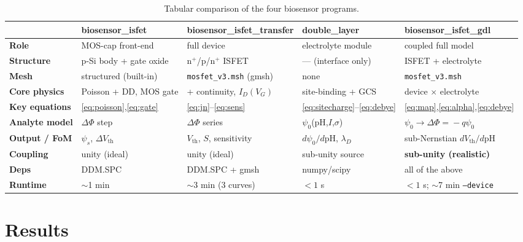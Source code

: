 \documentclass[11pt,a4paper]{article}
\newcommand{\code}[1]{\texttt{#1}}
\begin{document}
\begin{table}[htbp]
\centering
\captionsetup{width=\textwidth}
\caption{Tabular comparison of the four biosensor programs.}
\label{tab:compare}
\footnotesize
\renewcommand{\arraystretch}{1.35}
\begin{tabular}{@{}p{2.6cm}p{2.9cm}p{2.9cm}p{2.9cm}p{2.6cm}@{}}
\toprule
 & \textbf{biosensor\_isfet} & \textbf{biosensor\_isfet\_transfer} & \textbf{double\_layer} & \textbf{biosensor\_isfet\_gdl} \\
\midrule
\textbf{Role} & MOS-cap front-end & full device & electrolyte module & coupled full model \\
\textbf{Structure} & p-Si body + gate oxide & n$^+$/p/n$^+$ ISFET & --- (interface only) & ISFET + electrolyte \\
\textbf{Mesh} & structured (built-in) & \code{mosfet\_v3.msh} (gmsh) & none & \code{mosfet\_v3.msh} \\
\textbf{Core physics} & Poisson + DD, MOS gate & + continuity, $I_D(V_G)$ & site-binding + GCS & device $\times$ electrolyte \\
\textbf{Key equations} & \eqref{eq:poisson},\eqref{eq:gate} & \eqref{eq:jn}--\eqref{eq:sens} & \eqref{eq:sitecharge}--\eqref{eq:debye} & \eqref{eq:map},\eqref{eq:alpha},\eqref{eq:debye} \\
\textbf{Analyte model} & $\Delta\Phi$ step & $\Delta\Phi$ series & $\psi_0$(pH,$I$,$\sigma$) & $\psi_0\!\to\!\Delta\Phi\!=\!-q\psi_0$ \\
\textbf{Output / FoM} & $\psi_s$, $\Delta V_{\mathrm{th}}$ & $V_{\mathrm{th}}$, $S$, sensitivity & $d\psi_0/d\mathrm{pH}$, $\lambda_D$ & sub-Nernstian $dV_{\mathrm{th}}/d\mathrm{pH}$ \\
\textbf{Coupling} & unity (ideal) & unity (ideal) & sub-unity source & \textbf{sub-unity (realistic)} \\
\textbf{Deps} & DDM.SPC & DDM.SPC + gmsh & numpy/scipy & all of the above \\
\textbf{Runtime} & $\sim$1 min & $\sim$3 min (3 curves) & $<1$ s & $<1$ s; $\sim$7 min \code{--device} \\
\bottomrule
\end{tabular}
\end{table}

\section{Results}
\label{sec:results}
\end{document}
